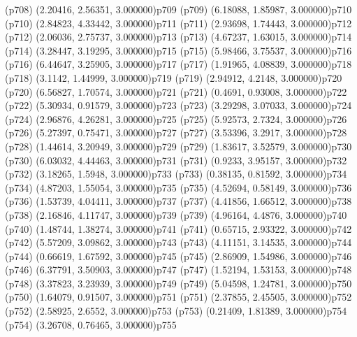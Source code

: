 \psdot(p708)
\psPoint(2.20416, 2.56351, 3.000000){p709}
\psdot(p709)
\psPoint(6.18088, 1.85987, 3.000000){p710}
\psdot(p710)
\psPoint(2.84823, 4.33442, 3.000000){p711}
\psdot(p711)
\psPoint(2.93698, 1.74443, 3.000000){p712}
\psdot(p712)
\psPoint(2.06036, 2.75737, 3.000000){p713}
\psdot(p713)
\psPoint(4.67237, 1.63015, 3.000000){p714}
\psdot(p714)
\psPoint(3.28447, 3.19295, 3.000000){p715}
\psdot(p715)
\psPoint(5.98466, 3.75537, 3.000000){p716}
\psdot(p716)
\psPoint(6.44647, 3.25905, 3.000000){p717}
\psdot(p717)
\psPoint(1.91965, 4.08839, 3.000000){p718}
\psdot(p718)
\psPoint(3.1142, 1.44999, 3.000000){p719}
\psdot(p719)
\psPoint(2.94912, 4.2148, 3.000000){p720}
\psdot(p720)
\psPoint(6.56827, 1.70574, 3.000000){p721}
\psdot(p721)
\psPoint(0.4691, 0.93008, 3.000000){p722}
\psdot(p722)
\psPoint(5.30934, 0.91579, 3.000000){p723}
\psdot(p723)
\psPoint(3.29298, 3.07033, 3.000000){p724}
\psdot(p724)
\psPoint(2.96876, 4.26281, 3.000000){p725}
\psdot(p725)
\psPoint(5.92573, 2.7324, 3.000000){p726}
\psdot(p726)
\psPoint(5.27397, 0.75471, 3.000000){p727}
\psdot(p727)
\psPoint(3.53396, 3.2917, 3.000000){p728}
\psdot(p728)
\psPoint(1.44614, 3.20949, 3.000000){p729}
\psdot(p729)
\psPoint(1.83617, 3.52579, 3.000000){p730}
\psdot(p730)
\psPoint(6.03032, 4.44463, 3.000000){p731}
\psdot(p731)
\psPoint(0.9233, 3.95157, 3.000000){p732}
\psdot(p732)
\psPoint(3.18265, 1.5948, 3.000000){p733}
\psdot(p733)
\psPoint(0.38135, 0.81592, 3.000000){p734}
\psdot(p734)
\psPoint(4.87203, 1.55054, 3.000000){p735}
\psdot(p735)
\psPoint(4.52694, 0.58149, 3.000000){p736}
\psdot(p736)
\psPoint(1.53739, 4.04411, 3.000000){p737}
\psdot(p737)
\psPoint(4.41856, 1.66512, 3.000000){p738}
\psdot(p738)
\psPoint(2.16846, 4.11747, 3.000000){p739}
\psdot(p739)
\psPoint(4.96164, 4.4876, 3.000000){p740}
\psdot(p740)
\psPoint(1.48744, 1.38274, 3.000000){p741}
\psdot(p741)
\psPoint(0.65715, 2.93322, 3.000000){p742}
\psdot(p742)
\psPoint(5.57209, 3.09862, 3.000000){p743}
\psdot(p743)
\psPoint(4.11151, 3.14535, 3.000000){p744}
\psdot(p744)
\psPoint(0.66619, 1.67592, 3.000000){p745}
\psdot(p745)
\psPoint(2.86909, 1.54986, 3.000000){p746}
\psdot(p746)
\psPoint(6.37791, 3.50903, 3.000000){p747}
\psdot(p747)
\psPoint(1.52194, 1.53153, 3.000000){p748}
\psdot(p748)
\psPoint(3.37823, 3.23939, 3.000000){p749}
\psdot(p749)
\psPoint(5.04598, 1.24781, 3.000000){p750}
\psdot(p750)
\psPoint(1.64079, 0.91507, 3.000000){p751}
\psdot(p751)
\psPoint(2.37855, 2.45505, 3.000000){p752}
\psdot(p752)
\psPoint(2.58925, 2.6552, 3.000000){p753}
\psdot(p753)
\psPoint(0.21409, 1.81389, 3.000000){p754}
\psdot(p754)
\psPoint(3.26708, 0.76465, 3.000000){p755}
